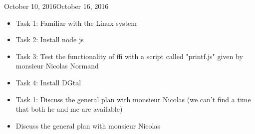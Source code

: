 \label{ann:WeeklyReports}


\begin{fichesuivi}{October 10, 2016}{October 16, 2016}
  
   \begin{travaileffectue}
      \begin{itemize}
         \item Task 1: Familiar with the Linux system
         \item Task 2: Install node js
         \item Task 3: Test the functionality of ffi with a script called "printf.js" given by monsieur Nicolas Normand 
         \item Task 4: Install DGtal
      \end{itemize}
   \end{travaileffectue}

   \begin{travailnoneffectue}
      \begin{itemize}
         \item Task 1:  Discuss the general plan with monsieur Nicolas (we can't find a time that both he and me are available)
      \end{itemize}
   \end{travailnoneffectue}

\begin{comment}
   \begin{echange}
      \begin{itemize}
         \item Questions;
         \item Answers;
         \item Clarification, comprehension;
         \item Choices, orientations, reorientations;
         \item Etc.
      \end{itemize}
   \end{echange}
\end{comment}

   \begin{planification}
      \begin{itemize}
         \item Discuss the general plan with monsieur Nicolas
      \end{itemize}
   \end{planification}
\end{fichesuivi}






